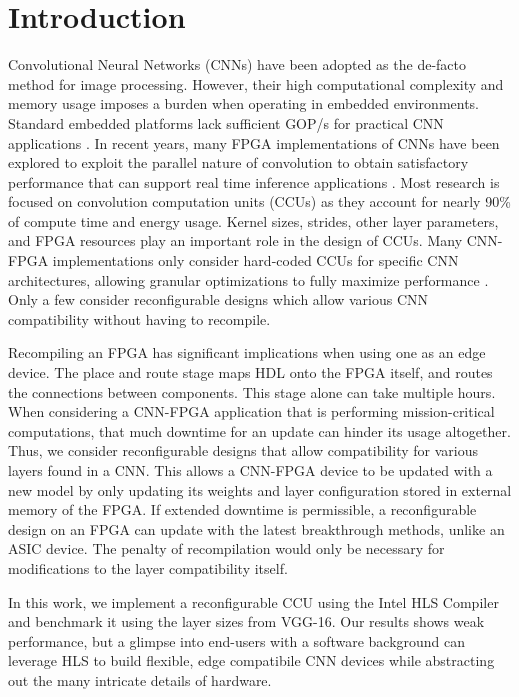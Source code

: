\chapter {Introduction}
 
Convolutional Neural Networks (CNNs) have been adopted as the de-facto method for image processing. However, their high computational complexity and memory usage imposes a burden when operating in embedded environments. Standard embedded platforms lack sufficient GOP/s for practical CNN applications \cite{guo2018angel}. In recent years, many FPGA implementations of CNNs have been explored to exploit the parallel nature of convolution to obtain satisfactory performance that can support real time inference applications \cite{toledo2012fpga}. Most research is focused on convolution computation units (CCUs) as they account for nearly 90\% of compute time and energy usage. Kernel sizes, strides, other layer parameters, and FPGA resources play an important role in the design of CCUs. Many CNN-FPGA implementations only consider hard-coded CCUs for specific CNN architectures, allowing granular optimizations to fully maximize performance \cite{liu2016automatic, toledo2012fpga, hwang2017efficient, bettoni2017convolutional, jiao2017accelerating}. Only a few consider reconfigurable designs which allow various CNN compatibility without having to recompile\cite{tu2017deep, dicecco2016caffeinated, lu2017evaluating}.

Recompiling an FPGA has significant implications when using one as an edge device. The place and route stage maps HDL onto the FPGA itself, and routes the connections between components. This stage alone can take multiple hours. When considering a CNN-FPGA application that is performing mission-critical computations, that much downtime for an update can hinder its usage altogether. Thus, we consider reconfigurable designs that allow compatibility for various layers found in a CNN. This allows a CNN-FPGA device to be updated with a new model by only updating its weights and layer configuration stored in external memory of the FPGA. If extended downtime is permissible, a reconfigurable design on an FPGA can update with the latest breakthrough methods, unlike an ASIC device. The penalty of recompilation would only be necessary for modifications to the layer compatibility itself.

In this work, we implement a reconfigurable CCU using the Intel HLS Compiler and benchmark it using the layer sizes from VGG-16. Our results shows weak performance, but a glimpse into end-users with a software background can leverage HLS to build flexible, edge compatibile CNN devices while abstracting out the many intricate details of hardware.

